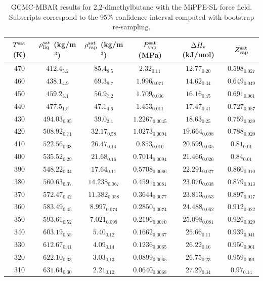 \documentclass[journal=jctc,manuscript=article]{achemso}
\begin{document}
\begin{table}[htb!]
	\caption{GCMC-MBAR results for 2,2-dimethylbutane with the MiPPE-SL force field. Subscripts correspond to the 95\% confidence interval computed with bootstrap re-sampling.}
	\begin{center}
		\begin{tabular}{|c|c|c|c|c|c|}
			\hline
			$T^{\rm sat}$ (K) & $\rho_{\rm liq}^{\rm sat}$ (kg/m$^3$) & $\rho_{\rm vap}^{\rm sat}$ (kg/m$^3$) & $P_{\rm vap}^{\rm sat}$ (MPa) & $\Delta H_{\rm v}$ (kJ/mol) & $Z_{\rm vap}^{\rm sat}$ \\ \hline
			470 & $412.4_{5.2}$ & $85.4_{8.5}$ & $2.32_{0.11}$ & $12.77_{0.20}$ & $0.598_{0.027}$ \\
			460 & $438.1_{4.9}$ & $69.3_{8.7}$ & $1.996_{0.071}$ & $14.62_{0.34}$ & $0.649_{0.049}$ \\
			450 & $459.2_{3.1}$ & $56.9_{7.2}$ & $1.709_{0.036}$ & $16.16_{0.45}$ & $0.691_{0.061}$ \\
			440 & $477.5_{1.5}$ & $47.1_{4.6}$ & $1.453_{0.011}$ & $17.47_{0.41}$ & $0.727_{0.057}$ \\
			430 & $494.03_{0.95}$ & $39.0_{2.1}$ & $1.2267_{0.0045}$ & $18.63_{0.25}$ & $0.759_{0.039}$ \\
			420 & $508.92_{0.71}$ & $32.17_{0.58}$ & $1.0273_{0.0094}$ & $19.664_{0.098}$ & $0.788_{0.020}$ \\
			410 & $522.56_{0.38}$ & $26.47_{0.14}$ & $0.853_{0.010}$ & $20.599_{0.035}$ & $0.81_{0.01}$ \\
			400 & $535.52_{0.29}$ & $21.68_{0.16}$ & $0.7014_{0.0094}$ & $21.466_{0.026}$ & $0.84_{0.01}$ \\
			390 & $548.22_{0.34}$ & $17.64_{0.11}$ & $0.5708_{0.0086}$ & $22.291_{0.027}$ & $0.860_{0.010}$ \\
			380 & $560.63_{0.37}$ & $14.238_{0.067}$ & $0.4591_{0.0081}$ & $23.076_{0.038}$ & $0.879_{0.013}$ \\
			370 & $572.47_{0.42}$ & $11.382_{0.058}$ & $0.3644_{0.0077}$ & $23.813_{0.053}$ & $0.897_{0.017}$ \\
			360 & $583.49_{0.45}$ & $8.997_{0.074}$ & $0.2850_{0.0074}$ & $24.488_{0.062}$ & $0.912_{0.022}$ \\
			350 & $593.61_{0.52}$ & $7.021_{0.099}$ & $0.2196_{0.0070}$ & $25.098_{0.081}$ & $0.926_{0.029}$ \\
			340 & $603.19_{0.55}$ & $5.40_{0.12}$ & $0.1662_{0.0067}$ & $25.66_{0.11}$ & $0.939_{0.041}$ \\
			330 & $612.67_{0.41}$ & $4.09_{0.14}$ & $0.1236_{0.0065}$ & $26.22_{0.16}$ & $0.950_{0.061}$ \\
			320 & $622.10_{0.33}$ & $3.03_{0.13}$ & $0.0899_{0.0065}$ & $26.75_{0.23}$ & $0.959_{0.091}$ \\
			310 & $631.64_{0.30}$ & $2.21_{0.12}$ & $0.0640_{0.0068}$ & $27.29_{0.34}$ & $0.97_{0.14}$ \\
			\hline
		\end{tabular}
	\end{center}
\end{table}
\end{document}
